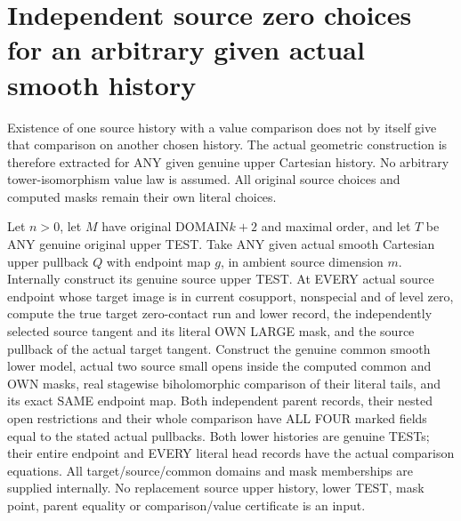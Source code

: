 \section{Independent source zero choices for an arbitrary given actual smooth history}

Existence of one source history with a value comparison does not by itself
give that comparison on another chosen history. The actual geometric
construction is therefore extracted for ANY given genuine upper Cartesian
history. No arbitrary tower-isomorphism value law is assumed. All original
source choices and computed masks remain their own literal choices.

\begin{theorem}
\label{hir:original-given-upper-cartesian-zero-choice-geometry}
\leanok
Let $n>0$, let $M$ have original DOMAIN$k+2$ and maximal order, and let $T$
be ANY genuine original upper TEST. Take ANY given actual smooth Cartesian
upper pullback $Q$ with endpoint map $g$, in ambient source dimension $m$.
Internally construct its genuine source upper TEST. At EVERY actual source
endpoint whose target image is in current cosupport, nonspecial and of
level zero, compute the true target zero-contact run and lower record,
the independently selected source tangent and its literal OWN LARGE mask,
and the source pullback of the actual target tangent. Construct the genuine
common smooth lower model, actual two source small opens inside the computed
common and OWN masks, real stagewise biholomorphic comparison of their
literal tails, and its exact SAME endpoint map. Both independent parent
records, their nested open restrictions and their whole comparison have ALL
FOUR marked fields equal to the stated actual pullbacks. Both lower histories
are genuine TESTs; their entire endpoint and EVERY literal head records have
the actual comparison equations. All target/source/common domains and mask
memberships are supplied internally. No replacement source upper history,
lower TEST, mask point, parent equality or comparison/value certificate is
an input.
\end{theorem}
